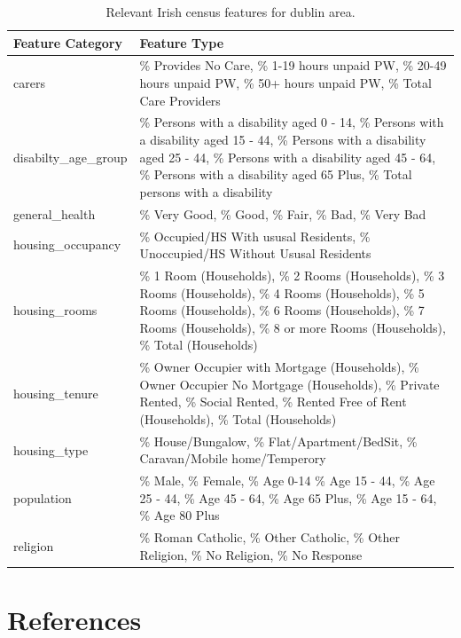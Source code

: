 \documentclass[]{elsarticle} %
\begin{document}
\begin{table}[t]

\caption{\label{tab:all-census-features}Relevant Irish census features for dublin area.}
\centering
\fontsize{8}{10}\selectfont
\begin{tabu} to 
\toprule
Feature Category & Feature Type\\
\midrule
carers & \% Provides No Care,                          
 \% 1-19 hours unpaid PW,                     
 \% 20-49 hours unpaid PW,                     
 \% 50+ hours unpaid PW,                      
 \% Total Care Providers\\
disabilty\_age\_group & \% Persons with a disability aged 0 - 14,      
 \% Persons with a disability aged 15 - 44,    
 \% Persons with a disability aged 25 - 44,   
 \% Persons with a disability aged 45 - 64,    
 \% Persons with a disability aged 65 Plus,   
 \% Total persons with a disability\\
general\_health & \% Very Good,                                
 \% Good,                                     
 \% Fair,                                     
 \% Bad,                                       
 \% Very Bad\\
housing\_occupancy & \% Occupied/HS With ususal Residents,         
 \%  Unoccupied/HS Without Ususal Residents\\
housing\_rooms & \% 1 Room (Households),                      
 \% 2 Rooms (Households),                      
 \% 3 Rooms (Households),                     
 \% 4 Rooms (Households),                      
 \% 5 Rooms (Households),                     
 \% 6 Rooms (Households),                      
 \% 7 Rooms (Households),                     
 \% 8 or more Rooms (Households),              
 \% Total (Households)\\
housing\_tenure & \% Owner Occupier with Mortgage (Households),
 \% Owner Occupier No Mortgage (Households),   
 \% Private Rented,                           
 \% Social Rented,                             
 \% Rented Free of Rent (Households),        
 \% Total (Households)\\
housing\_type & \% House/Bungalow,                           
 \% Flat/Apartment/BedSit,                     
 \% Caravan/Mobile home/Temperory\\
population & \% Male,
 \% Female,
 \% Age 0-14
 \% Age 15 - 44,    
 \% Age 25 - 44,   
 \% Age 45 - 64,    
 \% Age 65 Plus,
 \% Age 15 - 64, 
 \% Age 80 Plus\\
religion & \% Roman Catholic,
\% Other Catholic,
\% Other Religion,
\% No Religion,
\% No Response\\
\bottomrule
\end{tabu}
\end{table}

\hypertarget{references}{%
\section*{References}\label{references}}
\end{document}
